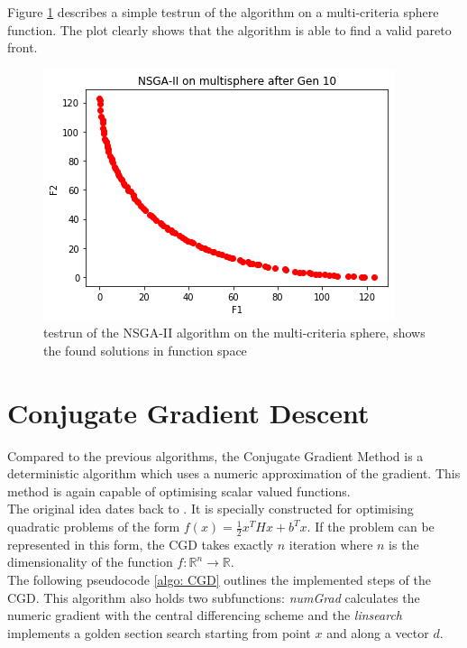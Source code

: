 \documentclass[./\jobname.tex]{subfiles}
\begin{document}
Figure \ref{fig:nsga2_verification} describes a simple testrun of the algorithm on a multi-criteria sphere function. The plot clearly shows that the algorithm is able to find a valid pareto front. 

\begin{figure}[H]
	\centering
	\includegraphics[width=0.9\linewidth]{../img/png/nsga2_verification.png}
	\caption{testrun of the NSGA-II algorithm on the multi-criteria sphere, shows the found solutions in function space}
	\label{fig:nsga2_verification}
\end{figure}



\section{Conjugate Gradient Descent}
\label{chap:cgd}
Compared to the previous algorithms, the Conjugate Gradient Method is a deterministic algorithm which uses a numeric approximation of the gradient. This method is again capable of optimising scalar valued functions. \\
The original idea dates back to \cite{hestenes_methods_1952}. It is specially constructed for optimising quadratic problems of the form $f(x) = \frac{1}{2}x^T H x + b^T x$. If the problem can be represented in this form, the CGD takes exactly $n$ iteration where $n$ is the dimensionality of the function $f: \mathbb{R}^n \rightarrow \mathbb{R}$. \\
The following pseudocode \ref{algo: CGD} outlines the implemented steps of the CGD. This algorithm also holds two subfunctions: \textit{numGrad} calculates the numeric gradient with the central differencing scheme and the \textit{linsearch} implements a golden section search starting from point $x$ and along a vector $d$. 
\end{document}

